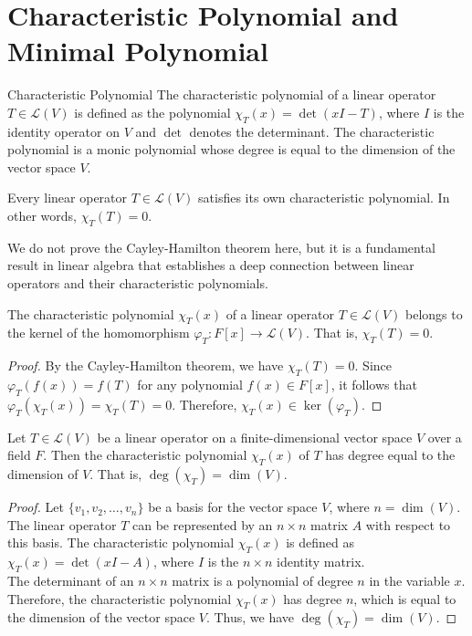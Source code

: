 \documentclass[openany]{book}
\begin{document}
\section{Characteristic Polynomial and Minimal Polynomial}
\begin{mydefinition}{Characteristic Polynomial}
The characteristic polynomial of a linear operator $T \in \mathcal{L}(V)$ is defined as the polynomial $\chi_T(x) = \det(xI - T)$, where $I$ is the identity operator on $V$ and $\det$ denotes the determinant. The characteristic polynomial is a monic polynomial whose degree is equal to the dimension of the vector space $V$.
\end{mydefinition}
\begin{mytheorem}
Every linear operator $T \in \mathcal{L}(V)$ satisfies its own characteristic polynomial. In other words, $\chi_T(T) = 0$.
\end{mytheorem}
We do not prove the Cayley-Hamilton theorem here, but it is a fundamental result in linear algebra that establishes a deep connection between linear operators and their characteristic polynomials. \cite{Artin} \\
\begin{corollary}
The characteristic polynomial $\chi_T(x)$ of a linear operator $T \in \mathcal{L}(V)$ belongs to the kernel of the homomorphism $\varphi_T: F[x] \to \mathcal{L}(V)$. That is, $\chi_T(T) = 0$.
\end{corollary}
\begin{proof}
By the Cayley-Hamilton theorem, we have $\chi_T(T) = 0$. Since $\varphi_T(f(x)) = f(T)$ for any polynomial $f(x) \in F[x]$, it follows that $\varphi_T(\chi_T(x)) = \chi_T(T) = 0$. Therefore, $\chi_T(x) \in \ker(\varphi_T)$.
\end{proof}
\begin{mytheorem}
Let $T \in \mathcal{L}(V)$ be a linear operator on a finite-dimensional vector space $V$ over a field $F$. Then the characteristic polynomial $\chi_T(x)$ of $T$ has degree equal to the dimension of $V$. That is, $\deg(\chi_T) = \dim(V)$.
\end{mytheorem}
\begin{proof}
Let $\{v_1, v_2, \ldots, v_n\}$ be a basis for the vector space $V$, where $n = \dim(V)$. The linear operator $T$ can be represented by an $n \times n$ matrix $A$ with respect to this basis. The characteristic polynomial $\chi_T(x)$ is defined as $\chi_T(x) = \det(xI - A)$, where $I$ is the $n \times n$ identity matrix. \\
The determinant of an $n \times n$ matrix is a polynomial of degree $n$ in the variable $x$. Therefore, the characteristic polynomial $\chi_T(x)$ has degree $n$, which is equal to the dimension of the vector space $V$. Thus, we have $\deg(\chi_T) = \dim(V)$.
\end{proof}
\end{document}
